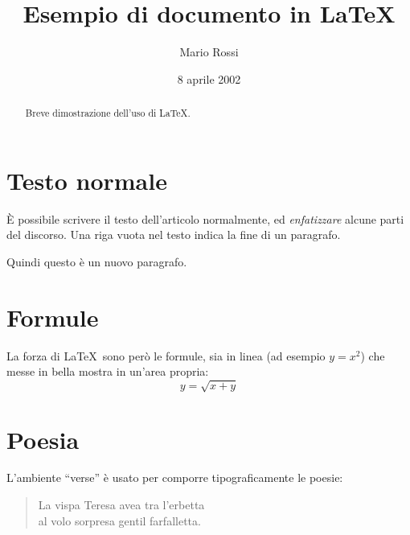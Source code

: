 \documentclass[a4paper,12pt]{article} %
\title{Esempio di documento in \LaTeX} %
\author{Mario Rossi}
\date{8 aprile 2002}
\begin{document}
\maketitle %

\begin{abstract} %
Breve dimostrazione dell'uso di \LaTeX.
\end{abstract} %

\tableofcontents %

\section{Testo normale} %
È possibile scrivere il testo dell'articolo normalmente, ed 
\emph{enfatizzare} alcune parti del discorso. %
Una riga vuota nel testo indica la fine di un paragrafo.

Quindi questo è un nuovo paragrafo.

\section{Formule} %
La forza di \LaTeX\ sono però le formule, sia in linea (ad esempio \(y=x^2\))
 che messe in bella mostra in un'area propria:
\[y=\sqrt{x+y}\]

\section{Poesia} %
L'ambiente ``verse'' è usato per comporre tipograficamente le poesie:
\begin{verse}
La vispa Teresa avea tra l'erbetta\\ %
al volo sorpresa gentil farfalletta.
\end{verse}
\end{document}
